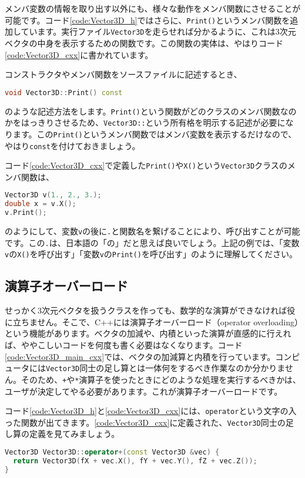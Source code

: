 メンバ変数の情報を取り出す以外にも、様々な動作をメンバ関数にさせることが可能です。コード\ref{code:Vector3D_h}ではさらに、\texttt{Print()}というメンバ関数を追加しています。実行ファイル\texttt{Vector3D}を走らせれば分かるように、これは3次元ベクタの中身を表示するための関数です。この関数の実体は、やはりコード\ref{code:Vector3D_cxx}に書かれています。

コンストラクタやメンバ関数をソースファイルに記述するとき、
\begin{lstlisting}[language=c++]
void Vector3D::Print() const
\end{lstlisting}
のような記述方法をします。\texttt{Print()}という関数がどのクラスのメンバ関数なのかをはっきりさせるため、\texttt{Vector3D::}という所有格を明示する記述が必要になります。この\texttt{Print()}というメンバ関数ではメンバ変数を表示するだけなので、やはり\texttt{const}を付けておきましょう。

コード\ref{code:Vector3D_cxx}で定義した\texttt{Print()}や\texttt{X()}という\texttt{Vector3D}クラスのメンバ関数は、
\begin{lstlisting}[language=c++]
Vector3D v(1., 2., 3.);
double x = v.X();
v.Print();
\end{lstlisting}
のようにして、変数\texttt{v}の後に\texttt{.}と関数名を繋げることにより、呼び出すことが可能です。この\texttt{.}は、日本語の「の」だと思えば良いでしょう。上記の例では、「変数\texttt{v}の\texttt{X()}を呼び出す」「変数\texttt{v}の\texttt{Print()}を呼び出す」のように理解してください。

\subsection{演算子オーバーロード}
\label{subsec:operator_overload}
せっかく3次元ベクタを扱うクラスを作っても、数学的な演算ができなければ役に立ちません。そこで、C++には演算子オーバーロード（operator overloading）という機能があります。ベクタの加減や、内積といった演算が直感的に行えれば、ややこしいコードを何度も書く必要はなくなります。コード\ref{code:Vector3D_main_cxx}では、ベクタの加減算と内積を行っています。コンピュータには\texttt{Vector3D}同士の足し算とは一体何をするべき作業なのか分かりません。そのため、\texttt{+}や\texttt{*}演算子を使ったときにどのような処理を実行するべきかは、ユーザが決定してやる必要があります。これが演算子オーバーロードです。

コード\ref{code:Vector3D_h}と\ref{code:Vector3D_cxx}には、\texttt{operator}という文字の入った関数が出てきます。\ref{code:Vector3D_cxx}に定義された、\texttt{Vector3D}同士の足し算の定義を見てみましょう。
\begin{lstlisting}[language=c++]
Vector3D Vector3D::operator+(const Vector3D &vec) {
  return Vector3D(fX + vec.X(), fY + vec.Y(), fZ + vec.Z());
}
\end{lstlisting}

